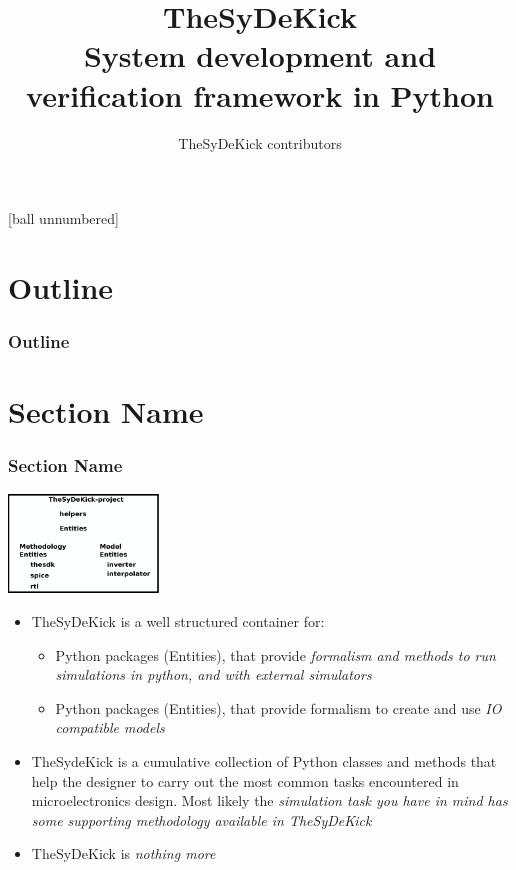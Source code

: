 \documentclass{sdkslides}
\title{\Huge{TheSyDeKick}\\ \vspace{0.2in} \normalsize{System development and
verification framework in Python}}
\institute[ELE]{TheSyDeKick Community}
\author{TheSyDeKick contributors}
\date{\lectdate}
\newcommand{\sectname}{Section Name}
\begin{document}
\sdktitleframe

[ball unnumbered]
\section*{Outline}
\begin{frame}[c]
    \frametitle{Outline}
    \tableofcontents
\end{frame}



\renewcommand{\sectname}{What is it?}
\section{\sectname}
\begin{frame}[t]
    \frametitle{\sectname}
    \centering
        \includegraphics[width=0.3\textwidth]{Pics/TheSyDeKick-entity-principles.eps}
        \begin{itemize}
            \item TheSyDeKick is a well structured container for: 
                \begin{itemize}
                    \item Python packages (Entities), that provide
                        \emph{formalism and methods to run simulations in
                        python, and with external simulators}
                    \item Python packages (Entities), that provide
                        formalism to create and use \emph{IO compatible models}
                \end{itemize}
            \item TheSydeKick is a cumulative collection of Python classes and
                methods that help the designer to carry out the most common
                tasks encountered in microelectronics design. Most likely the
                \emph{simulation task you have in mind has some supporting
                    methodology available in TheSyDeKick}
            \item TheSyDeKick is \emph{nothing more}
        \end{itemize}
\end{frame}
\end{document}

